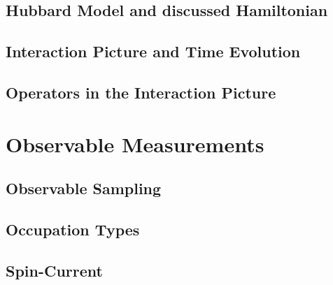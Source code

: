 \documentclass[
headings=optiontohead,              %
12pt,                               %
DIV=13,                             %
twoside=false,                      %
open=right,                         %
BCOR=00mm,                          %
toc=bibliographynumbered            %
]{scrreport}
\begin{document}
        \subsection{Hubbard Model and discussed Hamiltonian}
        \label{sec:theory-hubbard-hamiltonian}
        
        \FloatBarrier

        
        \subsection{Interaction Picture and Time Evolution}
        \label{sec:theory-interaction-picture}
        
        \FloatBarrier
        
        \subsection{Operators in the Interaction Picture}
        \label{sec:theory-approximation-evaluation}
        
        \FloatBarrier

    \section{Observable Measurements}
    \label{sec:theory-observables}
    
    \FloatBarrier

        \subsection{Observable Sampling}
        \label{sec:theory-observables-sampling}
        
        \FloatBarrier

        \subsection{Occupation Types}
        \label{sec:theory-observables-occupations}
        
        \FloatBarrier

        \subsection{Spin-Current}
        \label{sec:theory-observables-current}
        
        \FloatBarrier
\end{document}
